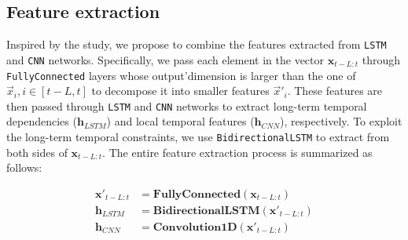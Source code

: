 \documentclass[aps,prb,groupedaddress,twocolumn,showpacs,dvipdfmx,superscriptaddress,pdftex]{revtex4-2}
\begin{document}


\subsection{Feature extraction}


Inspired by the \cite{vo2017multi} study, we propose to combine the features extracted from \verb|LSTM| and \verb|CNN| networks. Specifically, we pass each element in the vector $\mathbf{x}_{t-L:t}$ through \verb|FullyConnected| layers whose output'dimension is larger than the one of $\vec x_i, i\in[t-L, t]$ to decompose it into smaller features $\vec x'_i$. These features are then passed through \verb|LSTM| and \verb|CNN| networks to extract long-term temporal dependencies ($\mathbf{h}_{LSTM}$) and local temporal features ($\mathbf{h}_{CNN}$), respectively. To exploit the long-term temporal constraints, we use \verb|BidirectionalLSTM| to extract from both sides of $\mathbf{x}_{t-L:t}$. The entire feature extraction process is summarized as follows:

\begin{align}
    \mathbf{x'}_{t-L:t} &= \mathbf{FullyConnected}\left( \mathbf{x}_{t-L:t} \right)\\
    \mathbf{h}_{LSTM} &= \mathbf{BidirectionalLSTM}\left( \mathbf{x'}_{t-L:t} \right)\\
    \mathbf{h}_{CNN} &= \mathbf{Convolution1D}\left( \mathbf{x'}_{t-L:t} \right)
    \label{eq:feature}
\end{align}
\end{document}
